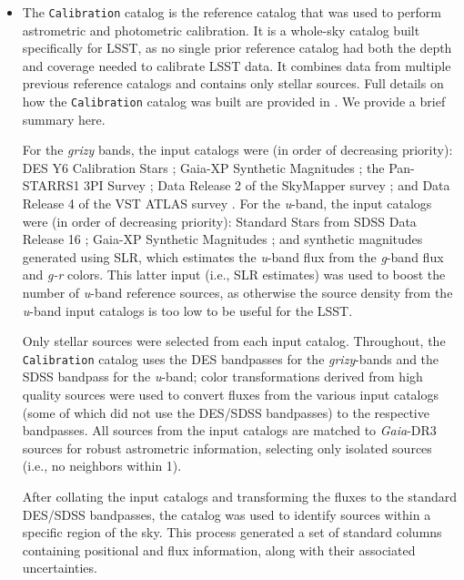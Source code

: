 \begin{itemize}
\item The \texttt{Calibration} catalog is the reference catalog that was used to perform astrometric and photometric \gls{calibration}. 
It is a whole-sky catalog built specifically for \gls{LSST}, as no single prior reference catalog had both the depth and coverage needed to calibrate \gls{LSST} data.
It combines data from multiple previous reference catalogs and contains only stellar sources.
Full details on how the \texttt{Calibration} catalog was built are provided in \cite{DMTN-277}. 
We provide a brief summary here.

For the \textit{grizy} bands, the input catalogs were (in order of decreasing priority): \gls{DES} Y6 Calibration Stars \citep{2023arXiv230501695R}; Gaia-\gls{XP} Synthetic Magnitudes \citep{2023A&A...674A..33G}; the \gls{Pan-STARRS}1 3PI Survey \citep{2016arXiv161205560C}; \gls{Data Release} 2 of the  SkyMapper survey \citep{2019PASA...36...33O}; and \gls{Data Release} 4 of the \gls{VST} \gls{ATLAS} survey \citep{2015MNRAS.451.4238S}. 
For the \textit{u}-band, the input catalogs were (in order of decreasing priority): Standard Stars from \gls{SDSS} \gls{Data Release} 16 \citep{2020ApJS..249....3A}; Gaia-\gls{XP} Synthetic Magnitudes \citep{2023A&A...674A..33G}; and synthetic magnitudes generated using \gls{SLR}, which estimates the \textit{u}-band \gls{flux} from the \textit{g}-band \gls{flux} and \textit{g-r} colors. 
This latter input (i.e., \gls{SLR} estimates) was used to boost the number of \textit{u}-band reference sources, as otherwise the source density from the \textit{u}-band input catalogs is too low to be useful for the \gls{LSST}.

Only stellar sources were selected from each input catalog. 
Throughout, the \texttt{Calibration} catalog uses the \gls{DES} bandpasses for the \textit{grizy}-bands and the \gls{SDSS} bandpass for the \textit{u}-band; color transformations derived from high quality sources were used to convert fluxes from the various input catalogs (some of which did not use the \gls{DES}/SDSS bandpasses) to the respective bandpasses. 
All sources from the input catalogs are matched to \textit{Gaia}-\gls{DR3} sources for robust astrometric information, selecting only isolated sources (i.e., no neighbors within 1\arcsec).

After collating the input catalogs and transforming the fluxes to the standard DES/SDSS bandpasses, the catalog was used to identify sources within a specific region of the sky. 
This process generated a set of standard columns containing positional and flux information, along with their associated uncertainties.

\end{itemize}



